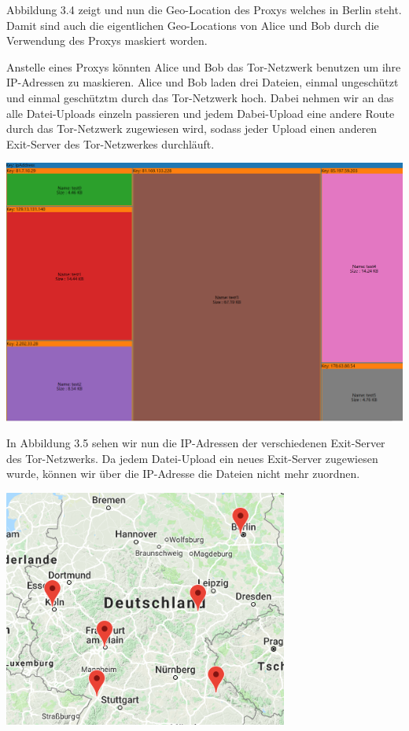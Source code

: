 \documentclass[
    fontsize=12pt,
    headings=small,
    parskip=half,           %
    bibliography=totoc,
    numbers=noenddot,       %
    open=any,               %
    ]{scrreprt}
\begin{document}
Abbildung 3.4 zeigt und nun die Geo-Location des Proxys welches in Berlin steht.
Damit sind auch die eigentlichen Geo-Locations von Alice und Bob durch die Verwendung des Proxys maskiert worden. 

Anstelle eines Proxys könnten Alice und Bob das Tor-Netzwerk benutzen um ihre IP-Adressen zu maskieren. Alice und Bob laden drei Dateien, einmal ungeschützt und einmal geschütztm durch das Tor-Netzwerk hoch.
Dabei nehmen wir an das alle Datei-Uploads einzeln passieren und jedem Dabei-Upload eine andere Route durch das Tor-Netzwerk zugewiesen wird, sodass jeder Upload einen anderen Exit-Server des Tor-Netzwerkes durchläuft. 

\begin{center}
\includegraphics[width=\textwidth]{../pic/IP-Tor-SetB-tree.png}\\
\end{center}

In Abbildung 3.5 sehen wir nun die IP-Adressen der verschiedenen Exit-Server des Tor-Netzwerks.
Da jedem Datei-Upload ein neues Exit-Server zugewiesen wurde, können wir über die IP-Adresse die Dateien nicht mehr zuordnen.

\begin{center}
\includegraphics[width=0.7\textwidth]{../pic/IP-Tor-SetB.png}\\
\end{center}
\end{document}
